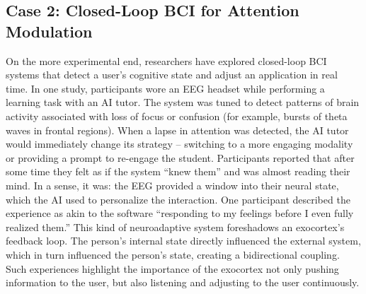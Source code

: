 \documentclass[11pt]{article}
\newcommand{\quotes}[1]{``#1''}
\begin{document}
\subsection*{Case 2: Closed-Loop BCI for Attention Modulation}
On the more experimental end, researchers have explored closed-loop BCI systems that detect a user's cognitive state and adjust an application in real time. In one study, participants wore an EEG headset while performing a learning task with an AI tutor. The system was tuned to detect patterns of brain activity associated with loss of focus or confusion (for example, bursts of theta waves in frontal regions). When a lapse in attention was detected, the AI tutor would immediately change its strategy -- switching to a more engaging modality or providing a prompt to re-engage the student. Participants reported that after some time they felt as if the system \quotes{knew them} and was almost reading their mind. In a sense, it was: the EEG provided a window into their neural state, which the AI used to personalize the interaction. One participant described the experience as akin to the software \quotes{responding to my feelings before I even fully realized them.} This kind of neuroadaptive system foreshadows an exocortex's feedback loop. The person's internal state directly influenced the external system, which in turn influenced the person's state, creating a bidirectional coupling. Such experiences highlight the importance of the exocortex not only pushing information to the user, but also listening and adjusting to the user continuously.
\end{document}
